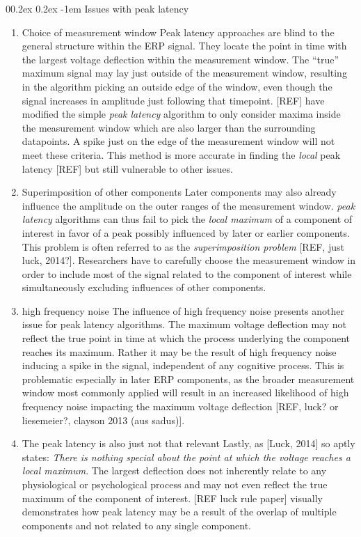 \documentclass[
  man,floatsintext]{apa7}
\makeatletter
\let\oldparagraph\paragraph
\renewcommand{\paragraph}[1]{\oldparagraph{#1}\mbox{}}
\renewcommand{\paragraph}{\@startsection{paragraph}{4}{\parindent}%
  {0\baselineskip \@plus 0.2ex \@minus 0.2ex}%
  {-1em}%
  {\normalfont\normalsize\bfseries\itshape\typesectitle}}
\renewcommand{\paragraph}{\@startsection{paragraph}{4}{\parindent}%
  {0\baselineskip \@plus 0.2ex \@minus 0.2ex}%
  {-1em}%
  {\normalfont\normalsize\bfseries\typesectitle}}
\makeatother
\begin{document}
\hypertarget{issues-with-peak-latency}{%
\paragraph{Issues with peak latency}\label{issues-with-peak-latency}}

\begin{enumerate}
\def\labelenumi{\arabic{enumi}.}
\item
  Choice of measurement window
  Peak latency approaches are blind to the general structure within the ERP signal. They locate the point in time with the largest voltage deflection within the measurement window. The ``true'' maximum signal may lay just outside of the measurement window, resulting in the algorithm picking an outside edge of the window, even though the signal increases in amplitude just following that timepoint. {[}REF{]} have modified the simple \emph{peak latency} algorithm to only consider maxima inside the measurement window which are also larger than the surrounding datapoints. A spike just on the edge of the measurement window will not meet these criteria. This method is more accurate in finding the \emph{local} peak latency {[}REF{]} but still vulnerable to other issues.
\item
  Superimposition of other components
  Later components may also already influence the amplitude on the outer ranges of the measurement window. \emph{peak latency} algorithms can thus fail to pick the \emph{local maximum} of a component of interest in favor of a peak possibly influenced by later or earlier components. This problem is often referred to as the \emph{superimposition problem} {[}REF, just luck, 2014?{]}.
  Researchers have to carefully choose the measurement window in order to include most of the signal related to the component of interest while simultaneously excluding influences of other components.
\item
  high frequency noise
  The influence of high frequency noise presents another issue for peak latency algorithms. The maximum voltage deflection may not reflect the true point in time at which the process underlying the component reaches its maximum. Rather it may be the result of high frequency noise inducing a spike in the signal, independent of any cognitive process. This is problematic especially in later ERP components, as the broader measurement window most commonly applied will result in an increased likelihood of high frequency noise impacting the maximum voltage deflection {[}REF, luck? or liesemeier?, clayson 2013 (aus sadus){]}.
\item
  The peak latency is also just not that relevant
  Lastly, as {[}Luck, 2014{]} so aptly states: \emph{There is nothing special about the point at which the voltage reaches a local maximum}. The largest deflection does not inherently relate to any physiological or psychological process and may not even reflect the true maximum of the component of interest. {[}REF luck rule paper{]} visually demonstrates how peak latency may be a result of the overlap of multiple components and not related to any single component.
\end{enumerate}
\end{document}
